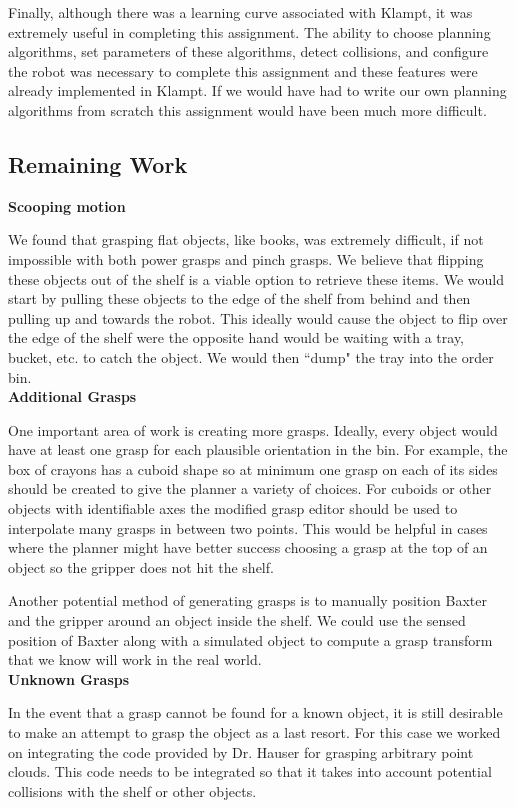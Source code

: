 \documentclass[12pt]{article}
\begin{document}
Finally, although there was a learning curve associated with Klampt, it was extremely useful in completing this assignment. The ability to choose planning algorithms, set parameters of these algorithms, detect collisions, and configure the robot was necessary to complete this assignment and these features were already implemented in Klampt. If we would have had to write our own planning algorithms from scratch this assignment would have been much more difficult. 

\subsection{Remaining Work}

\textbf{Scooping motion}

We found that grasping flat objects, like books, was extremely difficult, if not impossible with both power grasps and pinch grasps. We believe that flipping these objects out of the shelf is a viable option to retrieve these items. We would start by pulling these objects to the edge of the shelf from behind and then pulling up and towards the robot. This ideally would cause the object to flip over the edge of the shelf were the opposite hand would be waiting with a tray, bucket, etc. to catch the object. We would then ``dump" the tray into the order bin.\\


\noindent\textbf{Additional Grasps}

One important area of work is creating more grasps. Ideally, every object would have at least one grasp for each plausible orientation in the bin. For example, the box of crayons has a cuboid shape so at minimum one grasp on each of its sides should be created to give the planner a variety of choices. For cuboids or other objects with identifiable axes the modified grasp editor should be used to interpolate many grasps in between two points. This would be helpful in cases where the planner might have better success choosing a grasp at the top of an object so the gripper does not hit the shelf.

Another potential method of generating grasps is to manually position Baxter and the gripper around an object inside the shelf. We could use the sensed position of Baxter along with a simulated object to compute a grasp transform that we know will work in the real world.\\

\noindent\textbf{Unknown Grasps}

In the event that a grasp cannot be found for a known object, it is still desirable to make an attempt to grasp the object as a last resort. For this case we worked on integrating the code provided by Dr. Hauser for grasping arbitrary point clouds. This code needs to be integrated so that it takes into account potential collisions with the shelf or other objects.
\end{document}
